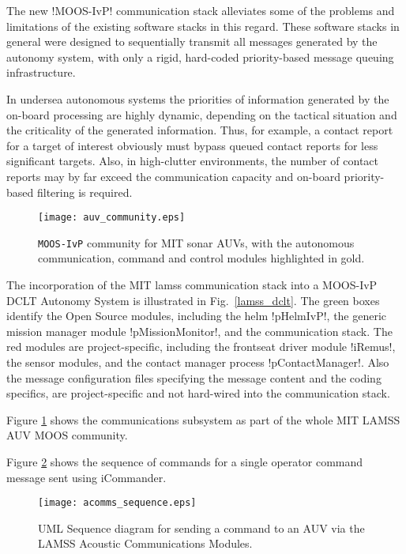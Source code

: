 The new !MOOS-IvP! communication stack alleviates some of the problems and limitations of the
existing software stacks in this regard. These software stacks in general were designed to
sequentially transmit all messages generated by the autonomy system,
with only a rigid, hard-coded priority-based message queuing
infrastructure.

In undersea autonomous systems the priorities of information generated
by the on-board processing are highly dynamic, depending on the
tactical situation and the criticality of the generated
information. Thus, for example, a contact report for a target of
interest obviously must bypass queued contact reports for less
significant targets. Also, in high-clutter environments, the number of
contact reports may by far exceed the communication capacity and on-board
priority-based filtering is required.

\begin{figure}[htp]
\centering \texttt{[image: auv\_community.eps]}
\caption{\texttt{MOOS-IvP} community for MIT sonar AUVs, with the autonomous
  communication, command and control modules highlighted in
  gold. }
\label{fig:moos_comms}
\end{figure}

The incorporation of the MIT \gls{lamss} communication stack into a MOOS-IvP
DCLT Autonomy System is illustrated in Fig.~\ref{lamss_dclt}. The
green boxes identify the Open Source modules, including the helm !pHelmIvP!, the generic mission manager module !pMissionMonitor!,
and the communication stack. The red modules are project-specific,
including the frontseat driver module !iRemus!, the sensor
modules, and the contact manager process !pContactManager!. Also
the message configuration files specifying the message content and the
coding specifics, are project-specific and not hard-wired into the
communication stack.

Figure \ref{fig:moos_comms} shows the communications subsystem as part of the whole
MIT LAMSS AUV MOOS community.


 Figure \ref{acomms_sequence} shows the sequence of commands for a single operator command message sent using iCommander.
 
 
\begin{figure}[tp]
  \centering 
  \texttt{[image: acomms\_sequence.eps]}
\caption{UML Sequence diagram for sending a command to an AUV via the LAMSS Acoustic Communications Modules. \label{acomms_sequence}}
\end{figure}


